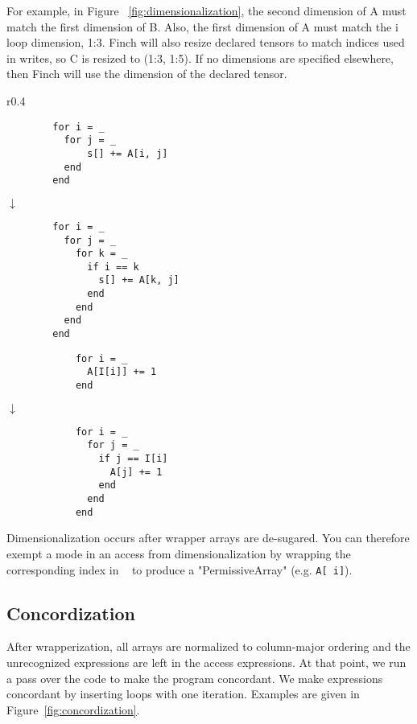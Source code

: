     For example, in Figure ~\ref{fig:dimensionalization}, the second dimension of A must match the first dimension of B. Also, the first dimension of A must match the i loop dimension, 1:3. Finch will also resize declared tensors to match indices used in writes, so C is resized to (1:3, 1:5). If no dimensions are specified elsewhere, then Finch will use the dimension of the declared tensor.
       
    \begin{wrapfigure}{r}{0.4\linewidth}
      \centering %
      \begin{minipage}{0.16\textwidth}
      \begin{verbatim}
        for i = _
          for j = _
              s[] += A[i, j]
          end
        end
      \end{verbatim}
      $\downarrow$
      \begin{verbatim}
        for i = _
          for j = _
            for k = _
              if i == k
                s[] += A[k, j]
              end
            end
          end
        end
      \end{verbatim}
      \end{minipage}\hfill%
      \begin{minipage}{0.12\textwidth}
          \begin{verbatim}
            for i = _
              A[I[i]] += 1
            end
          \end{verbatim}
          $\downarrow$
          \begin{verbatim}
            for i = _
              for j = _
                if j == I[i]
                  A[j] += 1
                end
              end
            end
          \end{verbatim}
      \end{minipage}\hfill
      \caption{Examples of concordization, transforming accesses to normal column major.}\label{fig:concordization}
      \vspace{-20pt}
  \end{wrapfigure} 
    Dimensionalization occurs after wrapper arrays are de-sugared. You can
    therefore exempt a mode in an access from dimensionalization by wrapping the
    corresponding index in \texttt{~} to produce a "PermissiveArray" (e.g. \texttt{A[~i]}).

\subsection{Concordization}
    After wrapperization, all arrays are normalized to column-major ordering and
    the unrecognized expressions are left in the access expressions. At that
    point, we run a pass over the code to make the program concordant. We make
    expressions concordant by inserting loops with one iteration. Examples are given in Figure~\ref{fig:concordization}.

